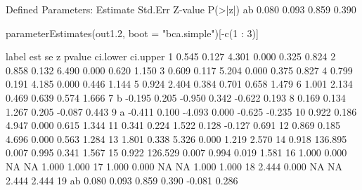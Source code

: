 \begin{Schunk}
\begin{Soutput}
Defined Parameters:
                   Estimate  Std.Err  Z-value  P(>|z|)
    ab                0.080    0.093    0.859    0.390
\end{Soutput}
\begin{Sinput}
 parameterEstimates(out1.2, boot = "bca.simple")[-c(1 : 3)]
\end{Sinput}
\begin{Soutput}
   label    est      se      z pvalue ci.lower ci.upper
1         0.545   0.127  4.301  0.000    0.325    0.824
2         0.858   0.132  6.490  0.000    0.620    1.150
3         0.609   0.117  5.204  0.000    0.375    0.827
4         0.799   0.191  4.185  0.000    0.446    1.144
5         0.924   2.404  0.384  0.701    0.658    1.479
6         1.001   2.134  0.469  0.639    0.574    1.666
7      b -0.195   0.205 -0.950  0.342   -0.622    0.193
8         0.169   0.134  1.267  0.205   -0.087    0.443
9      a -0.411   0.100 -4.093  0.000   -0.625   -0.235
10        0.922   0.186  4.947  0.000    0.615    1.344
11        0.341   0.224  1.522  0.128   -0.127    0.691
12        0.869   0.185  4.696  0.000    0.563    1.284
13        1.801   0.338  5.326  0.000    1.219    2.570
14        0.918 136.895  0.007  0.995    0.341    1.567
15        0.922 126.529  0.007  0.994    0.019    1.581
16        1.000   0.000     NA     NA    1.000    1.000
17        1.000   0.000     NA     NA    1.000    1.000
18        2.444   0.000     NA     NA    2.444    2.444
19    ab  0.080   0.093  0.859  0.390   -0.081    0.286
\end{Soutput}
\end{Schunk}

